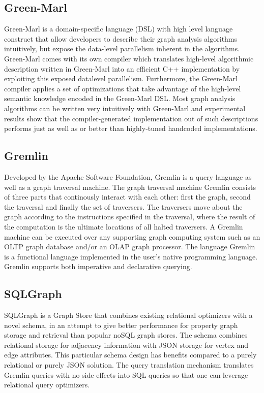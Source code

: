 \documentclass[11pt,singlecolumn]{scrartcl}
\begin{document}
\subsection{Green-Marl}
Green-Marl is a domain-specific language (DSL) with high level language construct that allow developers to describe their graph analysis algorithms intuitively, but expose the data-level parallelism inherent in the algorithms. Green-Marl comes with its own compiler which translates high-level algorithmic description written in Green-Marl into an efficient C++ implementation by exploiting this exposed datalevel parallelism. Furthermore, the Green-Marl compiler applies a set of optimizations that take advantage of the high-level semantic knowledge encoded in the Green-Marl DSL. Most graph analysis algorithms can be written very intuitively with Green-Marl and experimental results show that the compiler-generated implementation out of such descriptions performs just as well as or better than highly-tuned handcoded implementations.\cite {Greenmarl}

\subsection{Gremlin}
Developed by the Apache Software Foundation, Gremlin is a query language as well as a graph traversal machine. The graph traversal machine Gremlin consists of three parts that continously interact with each other: first the graph, second the traversal and finally the set of traversers. The traversers move about the graph according to the instructions specified in the traversal, where the result of the computation is the ultimate locations of all halted traversers. A Gremlin machine can be executed over any supporting graph computing system such as an OLTP graph database and/or an OLAP graph processor. The language Gremlin is a functional language implemented in the user’s native programming language. Gremlin supports both imperative and declarative querying.
\cite{Gremlin}


\subsection{SQLGraph}
SQLGraph is a Graph Store that combines existing relational optimizers with a novel schema, in an attempt to give better performance for property graph storage and retrieval than popular noSQL graph stores. The schema combines relational storage for adjacency information with JSON storage for vertex and edge attributes. This particular schema design has benefits compared to a purely relational or purely JSON solution. The query translation mechanism translates Gremlin queries with no side effects into SQL queries so that one can leverage relational query optimizers. \cite{Sun:2015}
\end{document}
